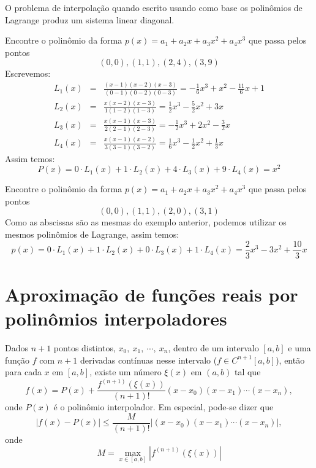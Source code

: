 \begin{obs} O problema de interpolação quando escrito usando como base os polinômios de Lagrange produz um sistema linear diagonal.
\end{obs}

\begin{ex}Encontre o polinômio da forma $p(x)=a_1+a_2x+a_3x^2+a_4x^3$ que passa pelos pontos
$$(0,0),(1,1),(2,4),(3,9)$$
Escrevemos:
\begin{eqnarray*}
L_1(x)&=& \frac{(x-1)(x-2)(x-3)}{(0-1)(0-2)(0-3)}=-\frac{1}{6}x^3+x^2-\frac{11}{6}x+1\\
L_2(x)&=& \frac{x(x-2)(x-3)}{1(1-2)(1-3)}=\frac{1}{2}x^3-\frac{5}{2}x^2+3x\\
L_3(x)&=& \frac{x(x-1)(x-3)}{2(2-1)(2-3)}=-\frac{1}{2}x^3+2x^2-\frac{3}{2}x\\
L_4(x)&=& \frac{x(x-1)(x-2)}{3(3-1)(3-2)}=\frac{1}{6}x^3-\frac{1}{2}x^2+\frac{1}{3}x
\end{eqnarray*}
Assim temos:
$$P(x)=0\cdot L_1(x)+1\cdot L_2(x)+4\cdot L_3(x)+9\cdot L_4(x)=x^2$$
\end{ex}

\begin{ex}Encontre o polinômio da forma $p(x)=a_1+a_2x+a_3x^2+a_4x^3$ que passa pelos pontos
$$(0,0),(1,1),(2,0),(3,1)$$
Como as abscissas são as mesmas do exemplo anterior, podemos utilizar os mesmos polinômios de Lagrange, assim temos:
$$p(x)=0\cdot L_1(x)+1\cdot L_2(x)+0\cdot L_3(x)+1\cdot L_4(x)=\frac{2}{3}x^3-3x^2+\frac{10}{3}x$$
\end{ex}

\section{Aproximação de funções reais por polinômios interpoladores}

\begin{teo}\label{teo_interp}
Dados $n+1$ pontos distintos, $x_0,\ x_1,\ \cdots,\ x_n$, dentro de um intervalo $[a,b]$ e uma função $f$ com $n+1$ derivadas contínuas nesse intervalo ($f\in C^{n+1}[a,b]$), então para cada $x$ em $[a,b]$, existe um número $\xi(x)$ em $(a,b)$ tal que
$$
f(x)=P(x)+\frac{f^{(n+1)}(\xi(x))}{(n+1)!}(x-x_0)(x-x_1)\cdots(x-x_n),
$$
onde $P(x)$ é o polinômio interpolador. Em especial, pode-se dizer que
$$
|f(x)-P(x)|\leq \frac{M}{(n+1)!}\left|(x-x_0)(x-x_1)\cdots(x-x_n)\right|,
$$
onde
$$
M=\max_{x\in[a,b]}|f^{(n+1)}(\xi(x))|
$$
\end{teo}

